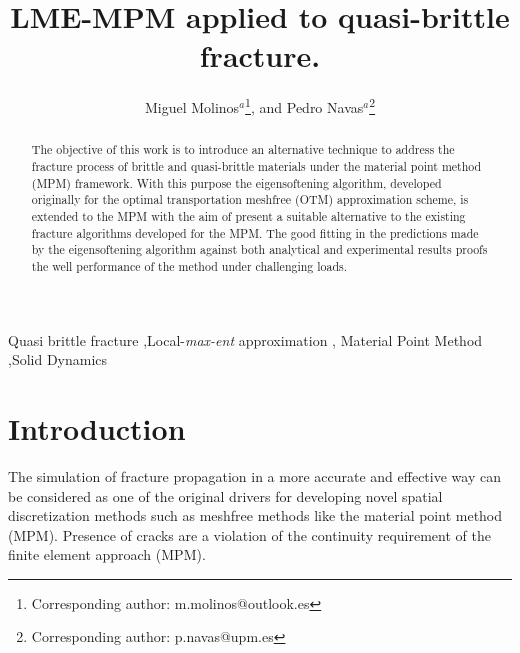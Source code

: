 \documentclass[preprint,12pt,a4paper]{elsarticle}
\begin{document}
\begin{frontmatter}

\title{LME-MPM applied to quasi-brittle fracture.}

\author{
Miguel Molinos$^a$\footnote{Corresponding author: m.molinos@outlook.es},
and Pedro Navas$^a$\footnote{Corresponding author: p.navas@upm.es}
 }
 \address{
 $^a$ ETSI Caminos, Canales y Puertos, Universidad Polit\'ectnica de Madrid.\\ c. Prof. Aranguren 3, 28040 Madrid, Spain
}

\begin{abstract}

  The objective of this work is to introduce an alternative
  technique to address the fracture process of brittle and
  quasi-brittle materials under the material point method (MPM)
  framework. With this purpose the eigensoftening algorithm, developed
  originally for the optimal transportation meshfree (OTM)
  approximation scheme, is extended to the MPM with the aim of present
  a suitable alternative to the existing fracture algorithms developed
  for the MPM. The good fitting in the predictions made by the
  eigensoftening algorithm against both analytical and experimental
  results proofs the well performance of the method under challenging loads.

\end{abstract}

\begin{keyword}
Quasi brittle fracture \sep Local-\textit{max-ent} approximation \sep
Material Point Method \sep Solid Dynamics
\end{keyword}

\end{frontmatter}

\linenumbers

\section{Introduction}
\label{sec:1}

The simulation of fracture propagation in a more accurate and
effective way can be considered as one of the original drivers for
developing novel spatial discretization methods such as meshfree
methods like the material point method (MPM). Presence of cracks are a violation of the
continuity requirement of the finite element approach (MPM).
\end{document}
